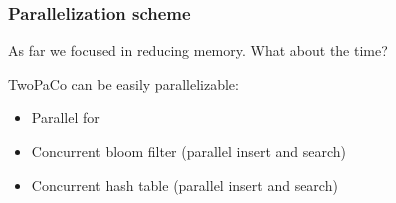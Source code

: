 \begin{frame}
	\frametitle{Parallelization scheme}
	\centering
	
	As far we focused in reducing memory. What about the time?
	
	\medskip
	
	TwoPaCo can be easily parallelizable:
	
	\begin{itemize}
	  \item Parallel for
	  \item Concurrent bloom filter (parallel insert and search)
	  \item Concurrent hash table (parallel insert and search)
	\end{itemize}
	
	
\end{frame}
